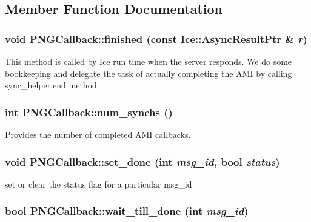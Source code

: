 \subsection{Member Function Documentation}
\hypertarget{class_p_n_g_callback_a568d03d9ea319a1b2d7207b25a3847a5}{
\subsubsection[{finished}]{\setlength{\rightskip}{0pt plus 5cm}void PNGCallback::finished (const Ice::AsyncResultPtr \& {\em r})}}
\label{class_p_n_g_callback_a568d03d9ea319a1b2d7207b25a3847a5}
This method is called by Ice run time when the server responds. We do some bookkeeping and delegate the task of actually completing the AMI by calling sync\_\-helper.end method \hypertarget{class_p_n_g_callback_a29f77829fce8f6a82032ece93fc8226e}{
\subsubsection[{num\_\-synchs}]{\setlength{\rightskip}{0pt plus 5cm}int PNGCallback::num\_\-synchs ()}}
\label{class_p_n_g_callback_a29f77829fce8f6a82032ece93fc8226e}


Provides the number of completed AMI callbacks. 

\hypertarget{class_p_n_g_callback_acdc65eaca43bead9c0f08cfe5e9e5338}{
\subsubsection[{set\_\-done}]{\setlength{\rightskip}{0pt plus 5cm}void PNGCallback::set\_\-done (int {\em msg\_\-id}, \/  bool {\em status})}}
\label{class_p_n_g_callback_acdc65eaca43bead9c0f08cfe5e9e5338}


set or clear the status flag for a particular msg\_\-id 

\hypertarget{class_p_n_g_callback_ad596e1f14c89d03e3f18cb71833d02c5}{
\subsubsection[{wait\_\-till\_\-done}]{\setlength{\rightskip}{0pt plus 5cm}bool PNGCallback::wait\_\-till\_\-done (int {\em msg\_\-id})}}
\label{class_p_n_g_callback_ad596e1f14c89d03e3f18cb71833d02c5}



